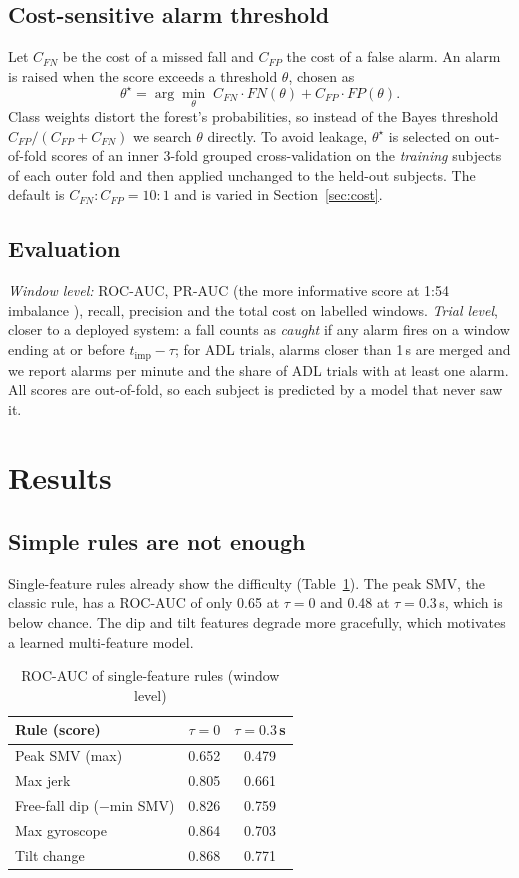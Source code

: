 \documentclass[conference]{IEEEtran}
\begin{document}
\subsection{Cost-sensitive alarm threshold}
Let $C_{FN}$ be the cost of a missed fall and $C_{FP}$ the cost of a false alarm. An alarm is raised when the score exceeds a threshold $\theta$, chosen as
\begin{equation}
\theta^\star=\arg\min_{\theta}\; C_{FN}\cdot FN(\theta)+C_{FP}\cdot FP(\theta).
\end{equation}
Class weights distort the forest's probabilities, so instead of the Bayes threshold $C_{FP}/(C_{FP}+C_{FN})$ we search $\theta$ directly. To avoid leakage, $\theta^\star$ is selected on out-of-fold scores of an inner 3-fold grouped cross-validation on the \emph{training} subjects of each outer fold and then applied unchanged to the held-out subjects. The default is $C_{FN}{:}C_{FP}=10{:}1$ and is varied in Section~\ref{sec:cost}.

\subsection{Evaluation}
\emph{Window level:} ROC-AUC, PR-AUC (the more informative score at 1:54 imbalance \cite{davis2006}), recall, precision and the total cost on labelled windows. \emph{Trial level}, closer to a deployed system: a fall counts as \emph{caught} if any alarm fires on a window ending at or before $t_{\mathrm{imp}}-\tau$; for ADL trials, alarms closer than 1\,s are merged and we report alarms per minute and the share of ADL trials with at least one alarm. All scores are out-of-fold, so each subject is predicted by a model that never saw it.

\section{Results}
\subsection{Simple rules are not enough}
Single-feature rules already show the difficulty (Table~\ref{tab:baseline}). The peak SMV, the classic rule, has a ROC-AUC of only 0.65 at $\tau=0$ and 0.48 at $\tau=0.3$\,s, which is below chance. The dip and tilt features degrade more gracefully, which motivates a learned multi-feature model.

\begin{table}[t]
\caption{ROC-AUC of single-feature rules (window level)}
\label{tab:baseline}
\centering
\footnotesize
\begin{tabular}{@{}lcc@{}}
\toprule
Rule (score) & $\tau=0$ & $\tau=0.3$\,s \\
\midrule
Peak SMV (max) & 0.652 & 0.479 \\
Max jerk & 0.805 & 0.661 \\
Free-fall dip ($-$min SMV) & 0.826 & 0.759 \\
Max gyroscope & 0.864 & 0.703 \\
Tilt change & 0.868 & 0.771 \\
\bottomrule
\end{tabular}
\end{table}
\end{document}
